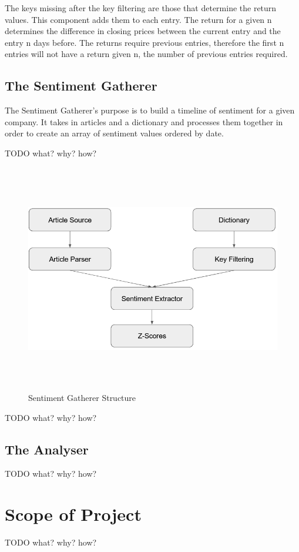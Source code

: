 The keys missing after the key filtering are those that determine the return values. This component adds them to each entry. The return for a given n determines the difference in closing prices between the current entry and the entry n days before. The returns require previous entries, therefore the first n entries will not have a return given n, the number of previous entries required.

\subsection{The Sentiment Gatherer}

The Sentiment Gatherer's purpose is to build a timeline of sentiment for a given company. It takes in articles and a dictionary and processes them together in order to create an array of sentiment values ordered by date.

TODO what? why? how?

\begin{figure}[h]
    \centering
    \includegraphics[width=15cm,height=10cm,keepaspectratio]{design/SentimentGathererStructure.png}
    \caption{Sentiment Gatherer Structure}
    \label{fig:sentimentgathererstructure}
\end{figure}

TODO what? why? how?

\subsection{The Analyser}
TODO what? why? how?

\section{Scope of Project}
TODO what? why? how?
